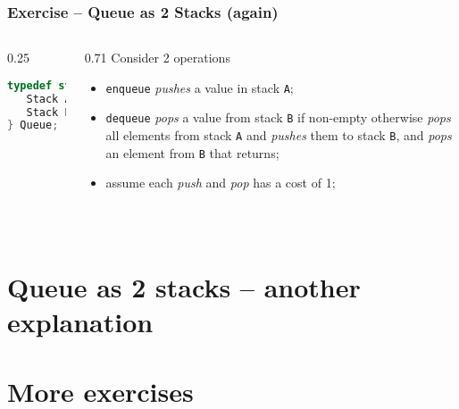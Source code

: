 \documentclass[aspectratio=169]{beamer}
\begin{document}
\begin{frame}[fragile]\frametitle{Exercise -- Queue as 2 Stacks (again)}

\begin{columns}
\begin{column}{0.25\textwidth}
\begin{lstlisting}[language=C++,emph={Stack,Queue}]
typedef struct queue {
   Stack A;
   Stack B;
} Queue;
\end{lstlisting}
\end{column}
\begin{column}{0.71\textwidth}
Consider 2 operations
\begin{itemize}
    \item \texttt{enqueue} \emph{pushes} a value in stack \texttt{A};
    \item \texttt{dequeue} \emph{pops} a value from stack \texttt{B} if non-empty otherwise \emph{pops} all elements from stack \texttt{A} and \emph{pushes} them to stack \texttt{B}, and \emph{pops} an element from \texttt{B} that returns;
    \item assume each \emph{push} and \emph{pop} has a cost of 1;
  \end{itemize}
\end{column}
\end{columns}

~\\[-3mm]
\end{frame}




\section{Queue as 2 stacks -- another explanation}



\section{More exercises}
\end{document}
